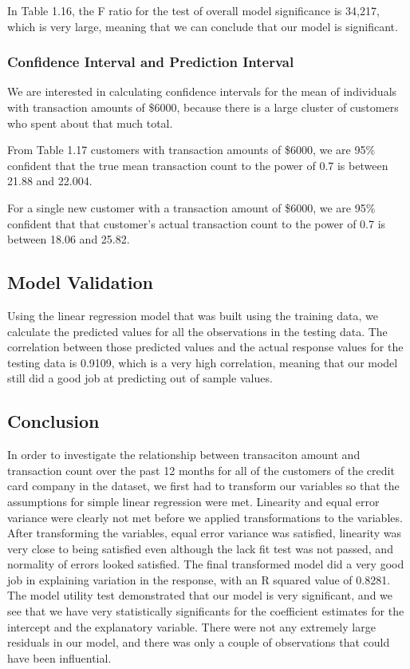 \documentclass[
]{article}
\begin{document}
In Table 1.16, the F ratio for the test of overall model significance is
34,217, which is very large, meaning that we can conclude that our model
is significant.

\hypertarget{confidence-interval-and-prediction-interval}{%
\subsubsection{Confidence Interval and Prediction
Interval}\label{confidence-interval-and-prediction-interval}}

We are interested in calculating confidence intervals for the mean of
individuals with transaction amounts of \$6000, because there is a large
cluster of customers who spent about that much total.

From Table 1.17 customers with transaction amounts of \$6000, we are
95\% confident that the true mean transaction count to the power of 0.7
is between 21.88 and 22.004.

For a single new customer with a transaction amount of \$6000, we are
95\% confident that that customer's actual transaction count to the
power of 0.7 is between 18.06 and 25.82.

\hypertarget{model-validation}{%
\subsection{Model Validation}\label{model-validation}}

Using the linear regression model that was built using the training
data, we calculate the predicted values for all the observations in the
testing data. The correlation between those predicted values and the
actual response values for the testing data is 0.9109, which is a very
high correlation, meaning that our model still did a good job at
predicting out of sample values.

\hypertarget{conclusion}{%
\subsection{Conclusion}\label{conclusion}}

In order to investigate the relationship between transaciton amount and
transaction count over the past 12 months for all of the customers of
the credit card company in the dataset, we first had to transform our
variables so that the assumptions for simple linear regression were met.
Linearity and equal error variance were clearly not met before we
applied transformations to the variables. After transforming the
variables, equal error variance was satisfied, linearity was very close
to being satisfied even although the lack fit test was not passed, and
normality of errors looked satisfied. The final transformed model did a
very good job in explaining variation in the response, with an R squared
value of 0.8281. The model utility test demonstrated that our model is
very significant, and we see that we have very statistically
significants for the coefficient estimates for the intercept and the
explanatory variable. There were not any extremely large residuals in
our model, and there was only a couple of observations that could have
been influential.
\end{document}
